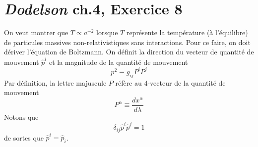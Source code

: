 \documentclass{article}
\numberwithin{equation}{section}
\newcommand{\hatp}{\hat{p}}
\begin{document}
\section{\textit{Dodelson} ch.4, Exercice 8}
On veut montrer que $T \propto a^{-2}$ lorsque $T$ représente la température (à l'équilibre)
de particules massives non-relativistiques sans interactions. Pour ce faire, 
on doit dériver l'équation de Boltzmann. On définit la direction 
du vecteur de quantité de mouvement $\hatp^{i}$ et la magnitude de la quantité de mouvement
\[
        p^2 \equiv  g_{ij} P^{i} P^{j}
\]
Par définition, la lettre majuscule $P$ réfère au 4-vecteur de la quantité de mouvement
\[
        P^{\alpha} \equiv\frac{d x^{\alpha}}{d \lambda} 
\]
Notons que
\[
        \delta_{ij}\hatp^{i}\hatp^{j} = 1
\]
de sortes que $\hatp^{i} = \hatp_{i}$. 
\end{document}
